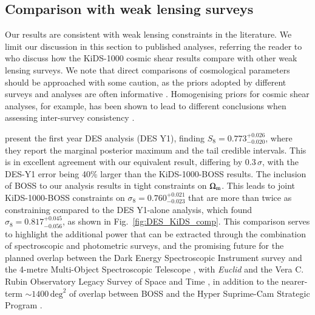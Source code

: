 \subsection{Comparison with weak lensing surveys}
\label{sec:WL_comp}
Our results are consistent with weak lensing constraints in the literature.   We limit our discussion in this section to published \tttp analyses, referring the reader to \citet{asgari/etal:inprep} who discuss how the KiDS-1000 cosmic shear results compare with other weak lensing surveys.   We note that direct comparisons of cosmological parameters should be approached with some caution, as the priors adopted by different surveys and analyses are often informative \citep[see section 6.1 in][]{joachimi/etal:inprep}.   Homogenising priors for cosmic shear analyses, for example, has been shown to lead to different conclusions when assessing inter-survey consistency \citep{chang/etal:2019, joudaki/etal:2020, asgari/etal:2020_KD}.   

\citet{abbott/etal:2018} present the first year \tttp DES analysis (DES Y1), finding $S_8=0.773^{+0.026}_{-0.020}$, where they report the marginal posterior maximum and the tail credible intervals.  
This is in excellent agreement with our equivalent result, differing by $0.3\,\sigma$, with the DES-Y1 error being 40\% larger than the KiDS-1000-BOSS \tttp results.  The inclusion of BOSS to our \tttp analysis results in tight constraints on $\Omega_{\rm m}$.  
This leads to joint KiDS-1000-BOSS constraints on $\sigma_8=0.760^{+0.021}_{-0.023}$ that are more than twice as constraining compared to the DES Y1-alone \tttp analysis, which found $\sigma_8=0.817^{+0.045}_{-0.056}$, as shown in Fig.~\ref{fig:DES_KiDS_comp}. 
This comparison serves to highlight the additional power that can be extracted through the combination of spectroscopic and photometric surveys,  and the promising future for the planned overlap between the Dark Energy Spectroscopic Instrument survey \citep{DESI/etal:2016} and the 4-metre Multi-Object Spectroscopic Telescope \citep[4MOST,][]{richard/etal:2019},
with {\it Euclid} and the Vera C. Rubin Observatory Legacy Survey of Space and Time \citep{laureijs/etal:2011,lsst/etal:2009}, in addition to the nearer-term $\sim\!1400\,\mathrm{deg}^{2}$ of overlap between BOSS and the Hyper Suprime-Cam Strategic Program \citep[HSC,][]{aihara/etal:2019}. 

